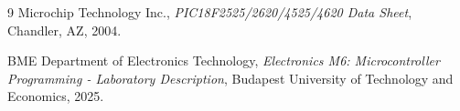 \documentclass[a4paper,11pt]{article}
\begin{document}
  \begin{thebibliography}{9}
    Microchip Technology Inc.,
    \textit{PIC18F2525/2620/4525/4620 Data Sheet},
    Chandler, AZ,
    2004.
    
    BME Department of Electronics Technology,
    \textit{Electronics M6: Microcontroller Programming - Laboratory Description},
    Budapest University of Technology and Economics,
    2025.
  \end{thebibliography}

  
\end{document}
